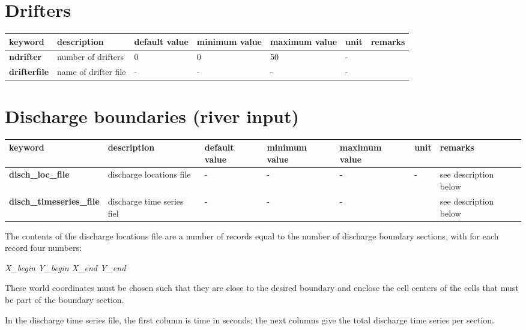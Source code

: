 \section{Drifters}

\textit{}

\begin{tabular}{|p{0.6in}|p{1.0in}|p{0.4in}|p{0.5in}|p{0.5in}|p{0.3in}|p{0.5in}|} \hline 
keyword\textbf{} & description & default value & minimum value & maximum value & unit & remarks \\ \hline 
\textbf{ndrifter} & number of drifters & 0 & 0 & 50 & - &  \\ \hline 
\textbf{drifterfile} & name of drifter file & - & - & - & - &  \\ \hline 
\end{tabular}


\section{Discharge boundaries (river input)}

\textit{}

\begin{tabular}{|p{1.0in}|p{0.6in}|p{0.4in}|p{0.5in}|p{0.5in}|p{0.3in}|p{0.6in}|} \hline 
keyword\textbf{} & description & default value & minimum value & maximum value & unit & remarks \\ \hline 
\textbf{disch\_loc\_file} & discharge locations file & - & - & - & - & see description \newline below \\ \hline 
\textbf{disch\_timeseries\_file} & discharge time series fiel & - & - & - &  & see description \newline below \\ \hline 
\end{tabular}

The contents of the discharge locations file are a number of records equal to the number of discharge boundary sections, with for each record four numbers:

\textit{X\_begin Y\_begin X\_end Y\_end}

\textit{}

These world coordinates must be chosen such that they are close to the desired boundary and enclose the cell centers of the cells that must be part of the boundary section.

In the discharge time series file, the first column is time in seconds; the next columns give the total discharge time series per section.



